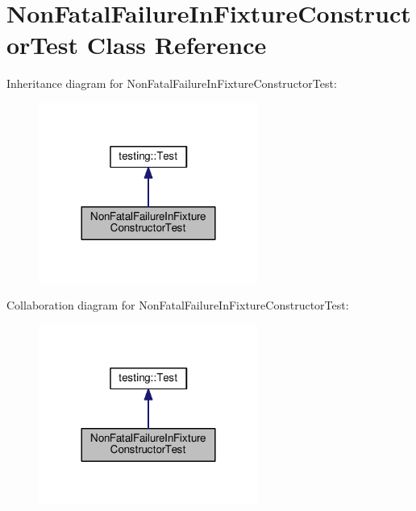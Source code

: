 \hypertarget{classNonFatalFailureInFixtureConstructorTest}{}\section{Non\+Fatal\+Failure\+In\+Fixture\+Constructor\+Test Class Reference}
\label{classNonFatalFailureInFixtureConstructorTest}


Inheritance diagram for Non\+Fatal\+Failure\+In\+Fixture\+Constructor\+Test\+:
\nopagebreak
\begin{figure}[H]
\begin{center}
\leavevmode
\includegraphics[width=204pt]{classNonFatalFailureInFixtureConstructorTest__inherit__graph}
\end{center}
\end{figure}


Collaboration diagram for Non\+Fatal\+Failure\+In\+Fixture\+Constructor\+Test\+:
\nopagebreak
\begin{figure}[H]
\begin{center}
\leavevmode
\includegraphics[width=204pt]{classNonFatalFailureInFixtureConstructorTest__coll__graph}
\end{center}
\end{figure}
